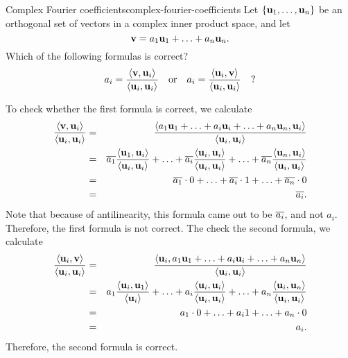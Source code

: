 \begin{example}{Complex Fourier coefficients}{complex-fourier-coefficients}
  Let $\set{\vect{u}_1,\ldots,\vect{u}_n}$ be an orthogonal set of
  vectors in a complex inner product space, and let
  \begin{equation*}
    \vect{v} = a_1\vect{u}_1 + \ldots + a_n\vect{u}_n.
  \end{equation*}
  Which of the following formulas is correct?
  \begin{equation*}
    a_i = \frac{\iprod{\vect{v},\vect{u}_i}}{\iprod{\vect{u}_i,\vect{u}_i}}
    \quad\mbox{or}\quad
    a_i = \frac{\iprod{\vect{u}_i,\vect{v}}}{\iprod{\vect{u}_i,\vect{u}_i}}
    \quad?
  \end{equation*}
\end{example}

\begin{solution}
  To check whether the first formula is correct, we calculate
  \begin{eqnarray*}
    \frac{\iprod{\vect{v},\vect{u}_i}}{\iprod{\vect{u}_i,\vect{u}_i}}
    &=&
        \frac{\iprod{a_1\vect{u}_1 + \ldots + a_i\vect{u}_i + \ldots + a_n\vect{u}_n,\vect{u}_i}}{\iprod{\vect{u}_i,\vect{u}_i}} \\
    &=&
        \conjugate{a_1}\frac{\iprod{\vect{u}_1,\vect{u}_i}}{\iprod{\vect{u}_i,\vect{u}_i}}
        + \ldots
        + \conjugate{a_i}\frac{\iprod{\vect{u}_i,\vect{u}_i}}{\iprod{\vect{u}_i,\vect{u}_i}}
        + \ldots
        + \conjugate{a_n}\frac{\iprod{\vect{u}_n,\vect{u}_i}}{\iprod{\vect{u}_i,\vect{u}_i}} \\
    &=&
        \conjugate{a_1}\cdot 0
        + \ldots
        + \conjugate{a_i}\cdot 1
        + \ldots
        + \conjugate{a_n}\cdot 0\\
    &=&
        \conjugate{a_i}.
  \end{eqnarray*}
  Note that because of antilinearity, this formula came out to be
  $\overline{a_i}$, and not $a_i$. Therefore, the first formula is
  not correct.  The check the second formula, we calculate
  \begin{eqnarray*}
    \frac{\iprod{\vect{u}_i,\vect{v}}}{\iprod{\vect{u}_i,\vect{u}_i}}
    &=&
        \frac{\iprod{\vect{u}_i,a_1\vect{u}_1 + \ldots + a_i\vect{u}_i + \ldots + a_n\vect{u}_n}}{\iprod{\vect{u}_i,\vect{u}_i}} \\
    &=&
        a_1\frac{\iprod{\vect{u}_i,\vect{u}_1}}{\iprod{\vect{u}_i}}
        + \ldots
        + a_i\frac{\iprod{\vect{u}_i,\vect{u}_i}}{\iprod{\vect{u}_i,\vect{u}_i}}
        + \ldots
        + a_n\frac{\iprod{\vect{u}_i,\vect{u}_n}}{\iprod{\vect{u}_i,\vect{u}_i}} \\
    &=&
        a_1\cdot 0
        + \ldots
        + a_i 1
        + \ldots
        + a_n\cdot 0\\
    &=&
        a_i.
  \end{eqnarray*}
  Therefore, the second formula is correct.
\end{solution}

